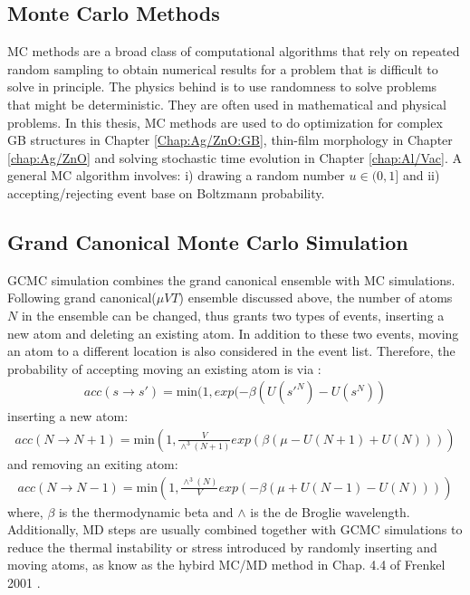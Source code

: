 \subsection{Monte Carlo Methods}
\label{Chap:Mech:GCMC:MC}

\ac{MC} methods are a broad class of computational algorithms that rely on repeated random sampling to obtain numerical results for a problem that is difficult to solve in principle. The physics behind is to use randomness to solve problems that might be deterministic. They are often used in mathematical \cite{hubbard2009modeling} and physical \cite{bortz1975new} problems. In this thesis, \ac{MC} methods are used to do optimization for complex \ac{GB} structures in Chapter \ref{Chap:Ag/ZnO:GB}, thin-film morphology in Chapter \ref{chap:Ag/ZnO} and solving stochastic time evolution in Chapter \ref{chap:Al/Vac}. A general \ac{MC} algorithm involves: i) drawing a random number $u \in (0,1]$ and ii) accepting/rejecting event base on Boltzmann probability.

\subsection{Grand Canonical Monte Carlo Simulation}
\label{Chap:Mech:GCMC:GCMC}

\ac{GCMC} simulation combines the grand canonical ensemble with \ac{MC} simulations. Following grand canonical($\mu VT$) ensemble discussed above, the number of atoms $N$ in the ensemble can be changed, thus grants two types of events, inserting a new atom and deleting an existing atom. In addition to these two events, moving an atom to a different location is also considered in the event list. Therefore, the probability of accepting moving an existing atom is via \cite{frenkel2001understanding}:
\begin{align}
acc(s \rightarrow s') = \text{min}(1, exp(-\beta(U(s'^N) - U(s^N))
\label{Chap:Meth:eq:acc:move}
\end{align}
inserting a new atom:
\begin{align}
acc(N \rightarrow N+1) = \text{min}(1, \frac{V}{\wedge^3(N+1)}exp(\beta(\mu - U(N + 1) + U(N)))) \label{Chap:Meth:eq:acc:insert}
\end{align}
and removing an exiting atom:
\begin{align}
acc(N \rightarrow N-1) = \text{min}(1, \frac{\wedge^3(N)}{V}exp(-\beta(\mu + U(N - 1) - U(N)))) \label{Chap:Meth:eq:acc:remove}
\end{align}
where, $\beta$ is the thermodynamic beta and $\wedge$ is the de Broglie wavelength. Additionally, \ac{MD} steps are usually combined together with \ac{GCMC} simulations to reduce the thermal instability or stress introduced by randomly inserting and moving atoms, as know as the hybird \ac{MC}/\ac{MD} method in Chap. 4.4 of Frenkel 2001 \cite{frenkel2001understanding}.